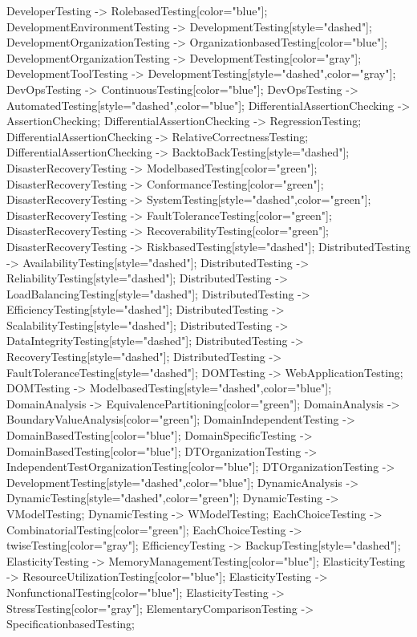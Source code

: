\documentclass{article}
\begin{document}
{DeveloperTesting -> RolebasedTesting[color="blue"];
DevelopmentEnvironmentTesting -> DevelopmentTesting[style="dashed"];
DevelopmentOrganizationTesting -> OrganizationbasedTesting[color="blue"];
DevelopmentOrganizationTesting -> DevelopmentTesting[color="gray"];
DevelopmentToolTesting -> DevelopmentTesting[style="dashed",color="gray"];
DevOpsTesting -> ContinuousTesting[color="blue"];
DevOpsTesting -> AutomatedTesting[style="dashed",color="blue"];
DifferentialAssertionChecking -> AssertionChecking;
DifferentialAssertionChecking -> RegressionTesting;
DifferentialAssertionChecking -> RelativeCorrectnessTesting;
DifferentialAssertionChecking -> BacktoBackTesting[style="dashed"];
DisasterRecoveryTesting -> ModelbasedTesting[color="green"];
DisasterRecoveryTesting -> ConformanceTesting[color="green"];
DisasterRecoveryTesting -> SystemTesting[style="dashed",color="green"];
DisasterRecoveryTesting -> FaultToleranceTesting[color="green"];
DisasterRecoveryTesting -> RecoverabilityTesting[color="green"];
DisasterRecoveryTesting -> RiskbasedTesting[style="dashed"];
DistributedTesting -> AvailabilityTesting[style="dashed"];
DistributedTesting -> ReliabilityTesting[style="dashed"];
DistributedTesting -> LoadBalancingTesting[style="dashed"];
DistributedTesting -> EfficiencyTesting[style="dashed"];
DistributedTesting -> ScalabilityTesting[style="dashed"];
DistributedTesting -> DataIntegrityTesting[style="dashed"];
DistributedTesting -> RecoveryTesting[style="dashed"];
DistributedTesting -> FaultToleranceTesting[style="dashed"];
DOMTesting -> WebApplicationTesting;
DOMTesting -> ModelbasedTesting[style="dashed",color="blue"];
DomainAnalysis -> EquivalencePartitioning[color="green"];
DomainAnalysis -> BoundaryValueAnalysis[color="green"];
DomainIndependentTesting -> DomainBasedTesting[color="blue"];
DomainSpecificTesting -> DomainBasedTesting[color="blue"];
DTOrganizationTesting -> IndependentTestOrganizationTesting[color="blue"];
DTOrganizationTesting -> DevelopmentTesting[style="dashed",color="blue"];
DynamicAnalysis -> DynamicTesting[style="dashed",color="green"];
DynamicTesting -> VModelTesting;
DynamicTesting -> WModelTesting;
EachChoiceTesting -> CombinatorialTesting[color="green"];
EachChoiceTesting -> twiseTesting[color="gray"];
EfficiencyTesting -> BackupTesting[style="dashed"];
ElasticityTesting -> MemoryManagementTesting[color="blue"];
ElasticityTesting -> ResourceUtilizationTesting[color="blue"];
ElasticityTesting -> NonfunctionalTesting[color="blue"];
ElasticityTesting -> StressTesting[color="gray"];
ElementaryComparisonTesting -> SpecificationbasedTesting;
}
\end{document}
